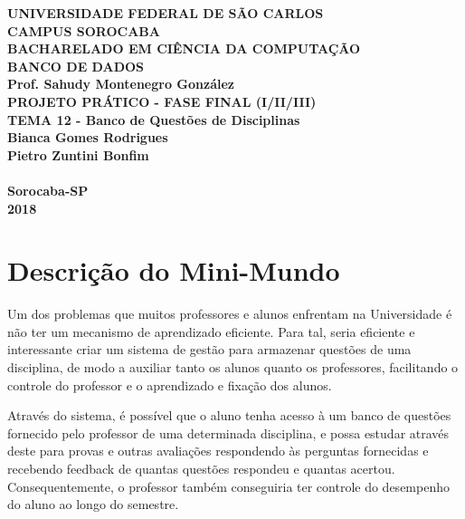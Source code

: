 \documentclass[12pt,a4paper]{article}
\begin{document}
\begin{titlepage}

\begin{center}

\textbf{UNIVERSIDADE FEDERAL DE SÃO CARLOS\\CAMPUS SOROCABA\\\vspace{3cm} BACHARELADO EM CIÊNCIA DA COMPUTAÇÃO\\\vspace{3cm}BANCO DE DADOS\\
Prof. Sahudy Montenegro González\\\vspace{3cm}
PROJETO PRÁTICO - FASE FINAL (I/II/III)\\\vspace{0.5cm}
TEMA 12 - Banco de Questões de Disciplinas\\\vspace{4.0cm}
Bianca Gomes Rodrigues\\
Pietro Zuntini Bonfim\\
\\\vspace{4cm}
Sorocaba-SP\\2018}

\end{center}

\end{titlepage}

\pagebreak
\renewcommand*\contentsname{Índice}
\tableofcontents
\pagebreak

\section{Descrição do Mini-Mundo}

Um dos problemas que muitos professores e alunos enfrentam na Universidade é não ter um mecanismo de aprendizado eficiente. Para tal, seria eficiente e interessante criar um sistema de gestão para armazenar questões de uma disciplina, de modo a auxiliar tanto os alunos quanto os professores, facilitando o controle do professor e o aprendizado e fixação dos alunos.\par
Através do sistema, é possível que o aluno tenha acesso à um banco de questões fornecido pelo professor de uma determinada disciplina, e possa estudar através deste para provas e outras avaliações respondendo às perguntas fornecidas e recebendo feedback de quantas questões respondeu e quantas acertou. Consequentemente, o professor também conseguiria ter controle do desempenho do aluno ao longo do semestre.\par
\end{document}
